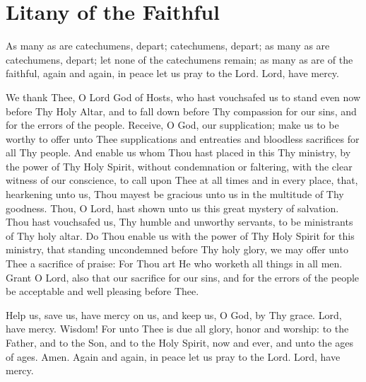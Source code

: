 \section{Litany of the Faithful}

\begin{liturgicaltext}
    \deacon As many as are catechumens, depart; catechumens, depart; as many as are catechumens, depart; let none of the catechumens remain; as many as are of the faithful, again and again, in peace let us pray to the Lord.
    \choirsemisecret Lord, have mercy. 
\end{liturgicaltext}
\begin{semisecret}
    \begin{secretprayerbasil}
        We thank Thee, O Lord God of Hosts, who hast vouchsafed us to stand even now before Thy Holy Altar, and to fall down before Thy compassion for our sins, and for the errors of the people. Receive, O God, our supplication; make us to be worthy to offer unto Thee supplications and entreaties and bloodless sacrifices for all Thy people. And enable us whom Thou hast placed in this Thy ministry, by the power of Thy Holy Spirit, without condemnation or faltering, with the clear witness of our conscience, to call upon Thee at all times and in every place, that, hearkening unto us, Thou mayest be gracious unto us in the multitude of Thy goodness.
        \switchcolumn
        Thou, O Lord, hast shown unto us this great mystery of salvation. Thou hast vouchsafed us, Thy humble and unworthy servants, to be ministrants of Thy holy altar. Do Thou enable us with the power of Thy Holy Spirit for this ministry, that standing uncondemned before Thy holy glory, we may offer unto Thee a sacrifice of praise: For Thou art He who worketh all things in all men. Grant O Lord, also that our sacrifice for our sins, and for the errors of the people be acceptable and well pleasing before Thee.
    \end{secretprayerbasil}
\end{semisecret}
\begin{liturgicaltext}
    \deacon Help us, save us, have mercy on us, and keep us, O God, by Thy grace.
    \choir Lord, have mercy.
    \deacon Wisdom!
    \priest For unto Thee is due all glory, honor and worship: to the Father, and to the Son, and to the Holy Spirit, now and ever, and unto the ages of ages.
    \choir Amen.
    \deacon Again and again, in peace let us pray to the Lord.
    \choirsemisecret Lord, have mercy. 
\end{liturgicaltext}
